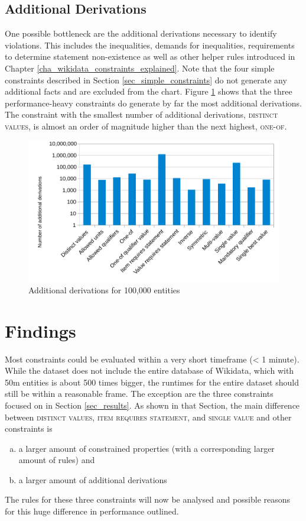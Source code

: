 \documentclass[hyperref,bachelorofscience,fleqn]{cgvpub}
\begin{document}
\subsection{Additional Derivations}
One possible bottleneck are the additional derivations necessary to identify violations. This includes the inequalities, demands for inequalities, requirements to determine statement non-existence as well as other helper rules introduced in Chapter \ref{cha_wikidata_constraints_explained}. Note that the four simple constraints described in Section \ref{sec_simple_constraints} do not generate any additional facts and are excluded from the chart. Figure \ref{fig_add_derivations} shows that the three performance-heavy constraints do generate by far the most additional derivations. The constraint with the smallest number of additional derivations, \textsc{distinct values}, is almost an order of magnitude higher than the next highest, \textsc{one-of}.

\begin{figure}
\includegraphics[width=\linewidth]{images/additionalDerivations100,000.pdf}
\caption{Additional derivations for 100,000 entities}\label{fig_add_derivations}
\end{figure}

\section{Findings}
Most constraints could be evaluated within a very short timeframe (< 1 minute). While the dataset does not include the entire database of Wikidata, which with 50m entities is about 500 times bigger, the runtimes for the entire dataset should still be within a reasonable frame. The exception are the three constraints focused on in Section \ref{sec_results}. As shown in that Section, the main difference between \textsc{distinct values}, \textsc{item requires statement}, and \textsc{single value} and other constraints is
\begin{enumerate}[a)]
\item a larger amount of constrained properties (with a corresponding larger amount of rules) and
\item a larger amount of additional derivations
\end{enumerate}
The rules for these three constraints will now be analysed and possible reasons for this huge difference in performance outlined.
\end{document}
